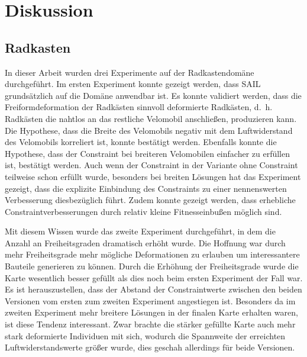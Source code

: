 \section{Diskussion}

\subsection{Radkasten}

In dieser Arbeit wurden drei Experimente auf der Radkastendomäne durchgeführt.
Im ersten Experiment konnte gezeigt werden, dass SAIL grundsätzlich auf die Domäne anwendbar ist.
Es konnte validiert werden, dass die Freiformdeformation der Radkästen sinnvoll deformierte Radkästen, d.~h. Radkästen die nahtlos an das restliche Velomobil anschließen, produzieren kann.
Die Hypothese, dass die Breite des Velomobils negativ mit dem Luftwiderstand des Velomobils korreliert ist, konnte bestätigt werden.
Ebenfalls konnte die Hypothese, dass der Constraint bei breiteren Velomobilen einfacher zu erfüllen ist, bestätigt werden.
Auch wenn der Constraint in der Variante ohne Constraint teilweise schon erfüllt wurde, besonders bei breiten Lösungen hat das Experiment gezeigt, dass die explizite Einbindung des Constraints zu einer nennenswerten Verbesserung diesbezüglich führt.
Zudem konnte gezeigt werden, dass erhebliche Constraintverbesserungen durch relativ kleine Fitnesseinbußen möglich sind.

Mit diesem Wissen wurde das zweite Experiment durchgeführt, in dem die Anzahl an Freiheitsgraden dramatisch erhöht wurde.
Die Hoffnung war durch mehr Freiheitsgrade mehr mögliche Deformationen zu erlauben um interessantere Bauteile generieren zu können.
Durch die Erhöhung der Freiheitsgrade wurde die Karte wesentlich besser gefüllt als dies noch beim ersten Experiment der Fall war.
Es ist herauszustellen, dass der Abstand der Constraintwerte zwischen den beiden Versionen vom ersten zum zweiten Experiment angestiegen ist.
Besonders da im zweiten Experiment mehr breitere Lösungen in der finalen Karte erhalten waren, ist diese Tendenz interessant.
Zwar brachte die stärker gefüllte Karte auch mehr stark deformierte Individuen mit sich, wodurch die Spannweite der erreichten Luftwiderstandswerte größer wurde, dies geschah allerdings für beide Versionen.

